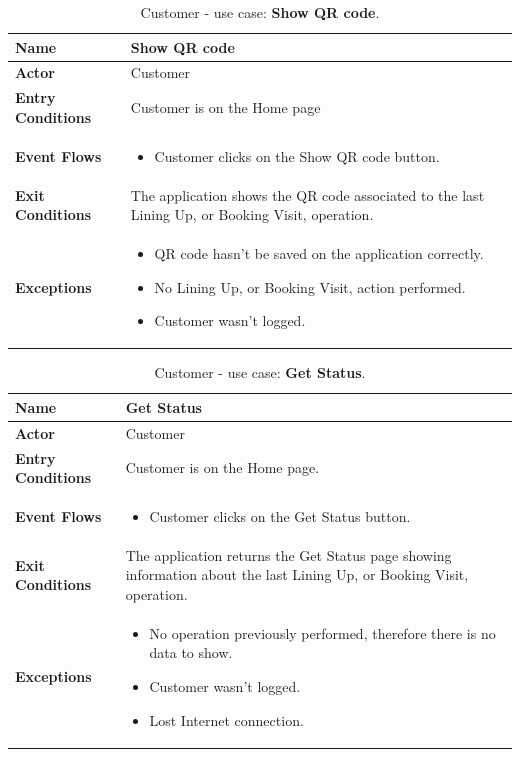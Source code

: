 \begin{table}[h!]
\centering
\begin{tabular}{| m{} | m{} |} 
	\hline
	\textbf{Name} & Show QR code \\ 
	\hline
	\textbf{Actor} & Customer \\ 
	\hline
	\textbf{Entry Conditions} & Customer is on the Home page \\ 
	\hline
	\textbf{Event Flows} &
	\begin{itemize}
	\item Customer clicks on the Show QR code button.
	\end{itemize} \\ 
	\hline
	\textbf{Exit Conditions} & The application shows the QR code associated to the last Lining Up, or Booking Visit, operation. \\ 
	\hline
	\textbf{Exceptions} &
	\begin{itemize}
	\item QR code hasn't be saved on the application correctly.
	\item No Lining Up, or Booking Visit, action performed. %
	\item Customer wasn't logged.
	\end{itemize} \\ 
	\hline
\end{tabular}
\caption{Customer - use case: \textbf{Show QR code}.}
\label{tableLogIn}
\end{table}

\begin{table}[h!]
\centering
\begin{tabular}{| m{} | m{} |} 
	\hline
	\textbf{Name} & Get Status \\ 
	\hline
	\textbf{Actor} & Customer \\ 
	\hline
	\textbf{Entry Conditions} & Customer is on the Home page. \\ 
	\hline
	\textbf{Event Flows} &
	\begin{itemize}
	\item Customer clicks on the Get Status button.
	\end{itemize} \\ 
	\hline
	\textbf{Exit Conditions} & The application returns the Get Status page showing information about the last Lining Up, or Booking Visit, operation. \\ 
	\hline
	\textbf{Exceptions} &
	\begin{itemize}
	\item No operation previously performed, therefore there is no data to show.
	\item Customer wasn't logged.
	\item Lost Internet connection.
	\end{itemize} \\ 
	\hline
\end{tabular}
\caption{Customer - use case: \textbf{Get Status}.}
\label{tableLogIn}
\end{table}

